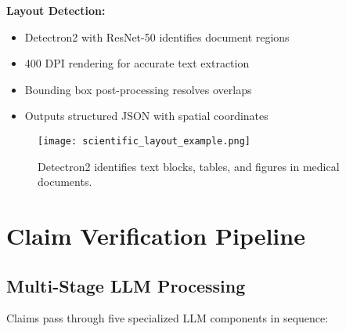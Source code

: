 \documentclass[11pt]{article}
\begin{document}
\textbf{Layout Detection:}
\begin{itemize}
\item Detectron2 with ResNet-50 identifies document regions
\item 400 DPI rendering for accurate text extraction
\item Bounding box post-processing resolves overlaps
\item Outputs structured JSON with spatial coordinates
\end{itemize}

\begin{figure}[H]
\centering
\texttt{[image: scientific\_layout\_example.png]}
\caption{Detectron2 identifies text blocks, tables, and figures in medical documents.}
\end{figure}

\section{Claim Verification Pipeline}

\subsection{Multi-Stage LLM Processing}

Claims pass through five specialized LLM components in sequence:
\end{document}

